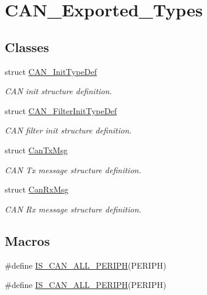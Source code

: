 \hypertarget{group___c_a_n___exported___types}{}\section{C\+A\+N\+\_\+\+Exported\+\_\+\+Types}
\label{group___c_a_n___exported___types}
\subsection*{Classes}
\begin{DoxyCompactItemize}
\item 
struct \hyperlink{struct_c_a_n___init_type_def}{C\+A\+N\+\_\+\+Init\+Type\+Def}
\begin{DoxyCompactList}\small\item\em C\+AN init structure definition. \end{DoxyCompactList}\item 
struct \hyperlink{struct_c_a_n___filter_init_type_def}{C\+A\+N\+\_\+\+Filter\+Init\+Type\+Def}
\begin{DoxyCompactList}\small\item\em C\+AN filter init structure definition. \end{DoxyCompactList}\item 
struct \hyperlink{struct_can_tx_msg}{Can\+Tx\+Msg}
\begin{DoxyCompactList}\small\item\em C\+AN Tx message structure definition. \end{DoxyCompactList}\item 
struct \hyperlink{struct_can_rx_msg}{Can\+Rx\+Msg}
\begin{DoxyCompactList}\small\item\em C\+AN Rx message structure definition. \end{DoxyCompactList}\end{DoxyCompactItemize}
\subsection*{Macros}
\begin{DoxyCompactItemize}
\item 
\#define \hyperlink{group___c_a_n___exported___types_gaf471a53f52a02078ffd842658d932f63}{I\+S\+\_\+\+C\+A\+N\+\_\+\+A\+L\+L\+\_\+\+P\+E\+R\+I\+PH}(P\+E\+R\+I\+PH)
\item 
\#define \hyperlink{group___c_a_n___exported___types_gaf471a53f52a02078ffd842658d932f63}{I\+S\+\_\+\+C\+A\+N\+\_\+\+A\+L\+L\+\_\+\+P\+E\+R\+I\+PH}(P\+E\+R\+I\+PH)
\end{DoxyCompactItemize}


